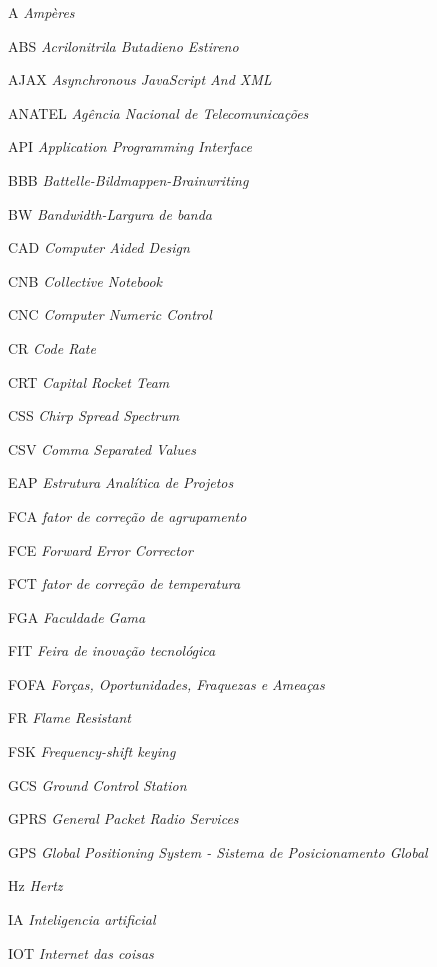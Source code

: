 \begin{siglas}
   \item [A] \textit{Ampères}
   \item [ABS] \textit{Acrilonitrila Butadieno Estireno}
   \item [AJAX] \textit{Asynchronous JavaScript And XML}
   \item [ANATEL] \textit{Agência Nacional de Telecomunicações}
   \item [API] \textit{Application Programming Interface}
   \item [BBB] \textit{Battelle-Bildmappen-Brainwriting}
   \item [BW] \textit{Bandwidth-Largura de banda}
   \item [CAD] \textit{Computer Aided Design}
   \item [CNB] \textit{Collective Notebook}
   \item [CNC] \textit{Computer Numeric Control}
   \item [CR] \textit{Code Rate}
   \item [CRT] \textit{Capital Rocket Team}
   \item [CSS] \textit{Chirp Spread Spectrum}
   \item [CSV] \textit{Comma Separated Values}
   \item [EAP] \textit{Estrutura Analítica de Projetos}
   \item [FCA] \textit{fator de correção de agrupamento}
   \item [FCE] \textit{Forward Error Corrector}
   \item [FCT]  \textit{fator de correção de temperatura}
   \item [FGA] \textit{Faculdade Gama}
   \item [FIT] \textit{Feira de inovação tecnológica}
   \item [FOFA] \textit{Forças, Oportunidades, Fraquezas e Ameaças}
   \item [FR] \textit{Flame Resistant}
   \item [FSK] \textit{Frequency-shift keying}
   \item [GCS] \textit{Ground Control Station}
   \item [GPRS] \textit{General Packet Radio Services}
   \item [GPS] \textit{Global Positioning System - Sistema de Posicionamento Global}
   \item [Hz] \textit{Hertz}
   \item [IA] \textit{Inteligencia artificial}
   \item [IOT] \textit{Internet das coisas}

\end{siglas}
